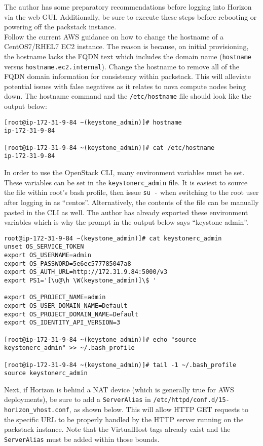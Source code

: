 The author has some preparatory recommendations before logging into Horizon
via the web GUI\@. Additionally, be sure to execute these steps before rebooting
or powering off the packstack instance. \\

Follow the current AWS guidance on how to change the hostname of a
CentOS7/RHEL7 EC2 instance. The reason is because, on initial provisioning,
the hostname lacks the FQDN text which includes the domain name (\verb|hostname|
versus \verb|hostname.ec2.internal|). Change the hostname to remove all of the
FQDN domain information for consistency within packstack. This will alleviate
potential issues with false negatives as it relates to nova compute nodes
being down. The hostname command and the \verb|/etc/hostname| file should look
like the output below:

\begin{verbatim}
[root@ip-172-31-9-84 ~(keystone_admin)]# hostname
ip-172-31-9-84

[root@ip-172-31-9-84 ~(keystone_admin)]# cat /etc/hostname
ip-172-31-9-84
\end{verbatim}

In order to use the OpenStack CLI, many environment variables must be set.
These variables can be set in the \verb|keystonerc_admin| file. It is easiest
to source the file within root’s bash profile, then issue \verb|su -| when
switching to the root user after logging in as ``centos''. Alternatively, the
contents of the file can be manually pasted in the CLI as well. The author has
already exported these environment variables which is why the prompt in the
output below says ``keystone admin''.

\begin{verbatim}
root@ip-172-31-9-84 ~(keystone_admin)]# cat keystonerc_admin
unset OS_SERVICE_TOKEN
export OS_USERNAME=admin
export OS_PASSWORD=5e6ec577785047a8
export OS_AUTH_URL=http://172.31.9.84:5000/v3
export PS1='[\u@\h \W(keystone_admin)]\$ '

export OS_PROJECT_NAME=admin
export OS_USER_DOMAIN_NAME=Default
export OS_PROJECT_DOMAIN_NAME=Default
export OS_IDENTITY_API_VERSION=3

[root@ip-172-31-9-84 ~(keystone_admin)]# echo "source keystonerc_admin" >> ~/.bash_profile

[root@ip-172-31-9-84 ~(keystone_admin)]# tail -1 ~/.bash_profile
source keystonerc_admin
\end{verbatim}

Next, if Horizon is behind a NAT device (which is generally true for AWS
deployments), be sure to add a \verb|ServerAlias| in
\verb|/etc/httpd/conf.d/15-horizon_vhost.conf|, as shown below. This will
allow HTTP GET requests to the specific URL to be properly handled by the HTTP
server running on the packstack instance. Note that the VirtualHost tags
already exist and the \verb|ServerAlias| must be added within those bounds.

